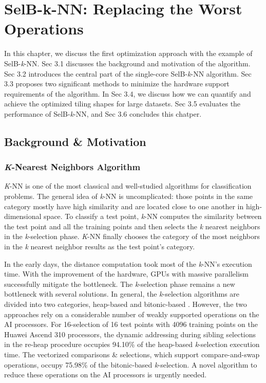 \documentclass[12pt]{extbook}
\begin{document}

\chapter{SelB-k-NN: Replacing the Worst Operations}
\label{sec_3}

In this chapter, we discuss the first optimization approach with the example of SelB-\textit{k}-NN. Sec 3.1 discusses the background and motivation of the algorithm. Sec 3.2 introduces the central part of the single-core SelB-\textit{k}-NN algorithm. Sec 3.3 proposes two significant methods to minimize the hardware support requirements of the algorithm. In Sec 3.4, we discuss how we can quantify and achieve the optimized tiling shapes for large datasets. Sec 3.5 evaluates the performance of SelB-\textit{k}-NN, and Sec 3.6 concludes this chatper.

\section{Background \& Motivation}

\subsection{\textit{K}-Nearest Neighbors Algorithm}

\textit{K}-NN is one of the most classical and well-studied algorithms for classification problems. The general idea of \textit{k}-NN is uncomplicated: those points in the same category mostly have high similarity and are located close to one another in high-dimensional space. To classify a test point, \textit{k}-NN computes the similarity between the test point and all the training points and then selects the \textit{k} nearest neighbors in the \textit{k}-selection phase. \textit{K}-NN finally chooses the category of the most neighbors in the \textit{k} nearest neighbor results as the test point's category.

In the early days, the distance computation took most of the \textit{k}-NN's execution time. With the improvement of the hardware, GPUs with massive parallelism successfully mitigate the bottleneck. The \textit{k}-selection phase remains a new bottleneck with several solutions. In general, the \textit{k}-selection algorithms are divided into two categories, heap-based \cite{DBLP:conf/medi/VelentzasVC21, DBLP:conf/sigmod/ShanbhagPM18, DBLP:conf/ccgrid/KatoH10, DBLP:journals/concurrency/KatoH12, DBLP:conf/icip/GarciaDNB10, DBLP:conf/egh/LiSPAOA12} and bitonic-based \cite{DBLP:conf/sigmod/ShanbhagPM18, DBLP:journals/tbd/JohnsonDJ21, DBLP:conf/ipps/Tang0EMG15}. However, the two approaches rely on a considerable number of weakly supported operations on the AI processors. For 16-selection of 16 test points with 4096 training points on the Huawei Ascend 310 processors, the dynamic addressing during sibling selections in the re-heap procedure occupies 94.10\% of the heap-based \textit{k}-selection execution time. The vectorized comparisons \& selections, which support compare-and-swap operations, occupy 75.98\% of the bitonic-based \textit{k}-selection. A novel algorithm to reduce these operations on the AI processors is urgently needed.
\end{document}
